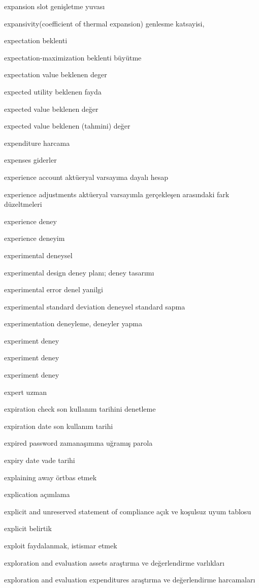 \documentclass[12pt,fleqn]{article}\usepackage{../../common}
\begin{document}
expansion slot genişletme yuvası

expansivity(coefficient of thermal expansion) genlesme katsayisi,

expectation beklenti

expectation-maximization beklenti büyütme

expectation value beklenen deger

expected utility beklenen fayda

expected value beklenen değer

expected value beklenen (tahmini) değer

expenditure harcama

expenses giderler

experience account aktüeryal varsayıma dayalı hesap

experience adjustments aktüeryal varsayımla gerçekleşen arasındaki fark düzeltmeleri

experience deney

experience deneyim

experimental deneysel

experimental design deney planı; deney tasarımı

experimental error denel yanilgi

experimental standard deviation deneysel standard sapma

experimentation deneyleme, deneyler yapma

experiment deney

experiment deney

experiment deney

expert uzman

expiration check son kullanım tarihini denetleme

expiration date son kullanım tarihi

expired password zamanaşımına uğramış parola

expiry date vade tarihi

explaining away örtbas etmek

explication açımlama

explicit and unreserved statement of compliance açık ve koşulsuz uyum tablosu

explicit belirtik

exploit faydalanmak, istismar etmek

exploration and evaluation assets araştırma ve değerlendirme varlıkları

exploration and evaluation expenditures araştırma ve değerlendirme harcamaları
\end{document}
